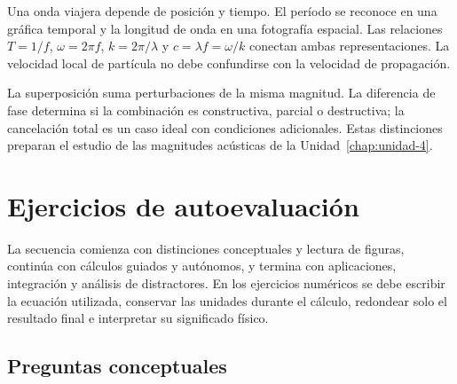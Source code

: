 Una onda viajera depende de posición y tiempo. El período se reconoce en una
gráfica temporal y la longitud de onda en una fotografía espacial. Las
relaciones \(T=1/f\), \(\omega=2\pi f\), \(k=2\pi/\lambda\) y
\(c=\lambda f=\omega/k\) conectan ambas representaciones. La velocidad local
de partícula no debe confundirse con la velocidad de propagación.

La superposición suma perturbaciones de la misma magnitud. La diferencia de
fase determina si la combinación es constructiva, parcial o destructiva; la
cancelación total es un caso ideal con condiciones adicionales. Estas
distinciones preparan el estudio de las magnitudes acústicas de la
Unidad~\ref{chap:unidad-4}.

\section{Ejercicios de autoevaluación}
\label{sec:u3-ejercicios}

La secuencia comienza con distinciones conceptuales y lectura de figuras,
continúa con cálculos guiados y autónomos, y termina con aplicaciones,
integración y análisis de distractores. En los ejercicios numéricos se debe
escribir la ecuación utilizada, conservar las unidades durante el cálculo,
redondear solo el resultado final e interpretar su significado físico.

\subsection*{Preguntas conceptuales}

